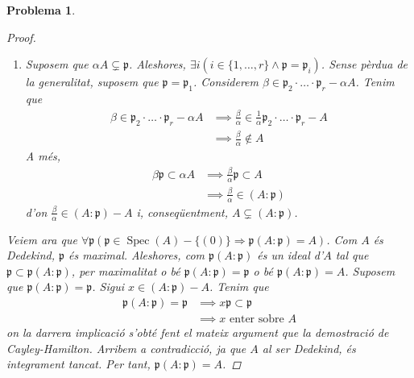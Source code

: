 \documentclass{article}
\DeclareMathOperator{\Spec}{Spec}
\newtheorem{problema}{Problema}
\begin{document}
\begin{problema}
\begin{enumerate}
\begin{proof}
\begin{enumerate}
\begin{align*}
                    &\implies\tfrac{1}{\alpha}\in(A:\mathfrak{p})
                \end{align*}
                Per tant, $\frac{1}{\alpha}\in(A:\mathfrak{p})-A$, d'on deduïm que $A\subsetneq(A:\mathfrak{p})$.
                \item Suposem que $\alpha A\subsetneq\mathfrak{p}$. Aleshores, $\exists i(i\in\{1,\ldots,r\}\land\mathfrak{p}=\mathfrak{p}_{i})$. Sense pèrdua de la generalitat, suposem que $\mathfrak{p}=\mathfrak{p}_{1}$. Considerem $\beta\in\mathfrak{p}_{2}\cdot\ldots\cdot\mathfrak{p}_{r}-\alpha A$. Tenim que
                \begin{align*}
                    \beta\in\mathfrak{p}_{2}\cdot\ldots\cdot\mathfrak{p}_{r}-\alpha A
                    &\implies\tfrac{\beta}{\alpha}\in\tfrac{1}{\alpha}\mathfrak{p}_{2}\cdot\ldots\cdot\mathfrak{p}_{r}-A\\
                    &\implies\tfrac{\beta}{\alpha}\notin A
                \end{align*}
                A més,
                \begin{align*}
                    \beta\mathfrak{p}\subset\alpha A
                    &\implies\tfrac{\beta}{\alpha}\mathfrak{p}\subset A\\
                    &\implies\tfrac{\beta}{\alpha}\in(A:\mathfrak{p})
                \end{align*}
                d'on $\frac{\beta}{\alpha}\in(A:\mathfrak{p})-A$ i, conseqüentment, $A\subsetneq(A:\mathfrak{p})$.
            \end{enumerate}
            Veiem ara que $\forall\mathfrak{p}(\mathfrak{p}\in\Spec(A)-\{(0)\}\Rightarrow\mathfrak{p}(A:\mathfrak{p})=A)$. Com $A$ és Dedekind, $\mathfrak{p}$ és maximal. Aleshores, com $\mathfrak{p}(A:\mathfrak{p})$ és un ideal d'$A$ tal que $\mathfrak{p}\subset\mathfrak{p}(A:\mathfrak{p})$, per maximalitat o bé $\mathfrak{p}(A:\mathfrak{p})=\mathfrak{p}$ o bé $\mathfrak{p}(A:\mathfrak{p})=A$. Suposem que $\mathfrak{p}(A:\mathfrak{p})=\mathfrak{p}$. Sigui $x\in(A:\mathfrak{p})-A$. Tenim que
            \begin{align*}
                \mathfrak{p}(A:\mathfrak{p})=\mathfrak{p}
                &\implies x\mathfrak{p}\subset\mathfrak{p}\\
                &\implies x\textrm{ enter sobre }A
            \end{align*}
            on la darrera implicació s'obté fent el mateix argument que la demostració de Cayley-Hamilton. Arribem a contradicció, ja que $A$ al ser Dedekind, és integrament tancat. Per tant, $\mathfrak{p}(A:\mathfrak{p})=A$.\newline

\end{proof}
\end{enumerate}
\end{problema}
\end{document}
